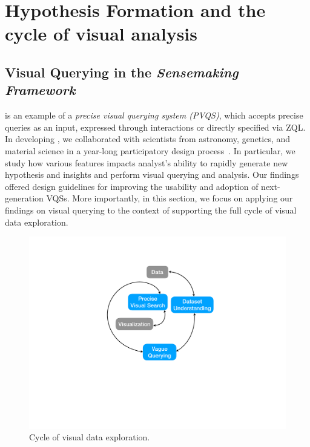 \section{Hypothesis Formation and the cycle of visual analysis\label{sec:hypothesis}}
\subsection{Visual Querying in the \textit{Sensemaking Framework}}
\zv is an example of a \emph{precise visual querying system (PVQS)}, which accepts precise queries as an input, expressed through interactions or directly specified via ZQL. In developing \zv, we collaborated with scientists from astronomy, genetics, and material science in a year-long participatory design process~\cite{Lee2017}. In particular, we study how various features impacts analyst's ability to rapidly generate new hypothesis and insights and perform visual querying and analysis. Our findings offered design guidelines for improving the usability and adoption of next-generation VQSs. More importantly, in this section, we focus on applying our findings on visual querying to the context of supporting the full cycle of visual data exploration. 
\begin{figure}[h!]
\label{fig:cycle}
\centering
\includegraphics[width=0.5\linewidth]{figures/cycle.pdf}
\caption{Cycle of visual data exploration.}
\end{figure}

